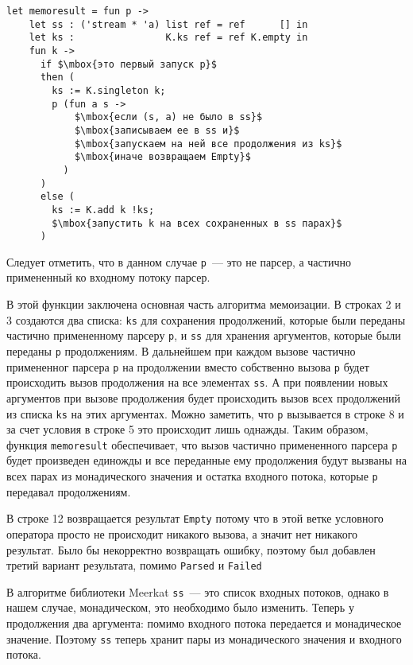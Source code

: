 \begin{lstlisting}[basicstyle=\small, caption=Алгоритм мемоизации]
  let memoresult = fun p ->
    let ss : ('stream * 'a) list ref = ref      [] in
    let ks :                K.ks ref = ref K.empty in
    fun k ->
      if $\mbox{это первый запуск p}$
      then (
        ks := K.singleton k;
        p (fun a s ->
            $\mbox{если (s, a) не было в ss}$
            $\mbox{записываем ее в ss и}$
            $\mbox{запускаем на ней все продолжения из ks}$
            $\mbox{иначе возвращаем Empty}$
          )
      )
      else (
        ks := K.add k !ks;
        $\mbox{запустить k на всех сохраненных в ss парах}$
      )
\end{lstlisting}

Следует отметить, что в данном случае \lstinline|p|~--- это не парсер, а частично примененный ко входному потоку парсер.

В этой функции заключена основная часть алгоритма мемоизации. В строках 2 и 3 создаются два списка: \lstinline|ks| для сохранения продолжений, которые были переданы частично примененному парсеру \lstinline|p|, и \lstinline|ss| для хранения аргументов, которые были переданы \lstinline|р| продолжениям. В дальнейшем при каждом вызове частично примененног парсера \lstinline|p| на продолжении вместо собственно вызова \lstinline|p| будет происходить вызов продолжения на все элементах \lstinline|ss|. А при появлении новых аргументов при вызове продолжения будет происходить вызов всех продолжений из списка \lstinline|ks| на этих аргументах. Можно заметить, что \lstinline|р| вызывается в строке 8 и за счет условия в строке 5 это происходит лишь однажды. Таким образом, функция \lstinline|memoresult| обеспечивает, что вызов частично примененного парсера \lstinline|р| будет произведен единожды и все переданные ему продолжения будут вызваны на всех парах из монадического значения и остатка входного потока, которые \lstinline|р| передавал продолжениям.

В строке 12 возвращается результат \lstinline|Empty| потому что в этой ветке условного оператора просто не происходит никакого вызова, а значит нет никакого результат. Было бы некорректно возвращать ошибку, поэтому был добавлен третий вариант результата, помимо \lstinline|Parsed| и \lstinline|Failed|

В алгоритме библиотеки Meerkat \lstinline|ss|~--- это список входных потоков, однако в нашем случае, монадическом, это необходимо было изменить. Теперь у продолжения два аргумента: помимо входного потока передается и монадическое значение. Поэтому \lstinline|ss| теперь хранит пары из монадического значения и входного потока.

